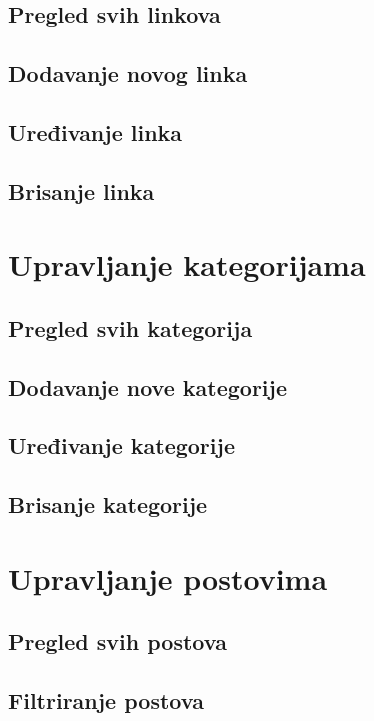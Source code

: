 \documentclass[times, utf8, zavrsni]{fer}
\begin{document}
\subsection{Pregled svih linkova}

\subsection{Dodavanje novog linka}

\subsection{Uređivanje linka}

\subsection{Brisanje linka}

\section{Upravljanje kategorijama}

\subsection{Pregled svih kategorija}

\subsection{Dodavanje nove kategorije}

\subsection{Uređivanje kategorije}

\subsection{Brisanje kategorije}

\section{Upravljanje postovima}

\subsection{Pregled svih postova}

\subsection{Filtriranje postova}
\end{document}
